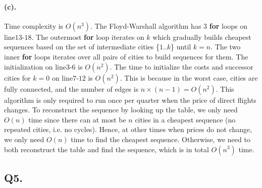 \documentclass[12pt]{article}
\begin{document}
\paragraph{(c).}
Time complexity is \(O(n^3)\). The Floyd-Warshall algorithm has 3 \textbf{for} loops on line\(13\)-\(18\). The outermost \textbf{for} loop iterates on \(k\) which gradually builds cheapest sequences based on the set of intermediate cities \{\(1..k\)\} until \(k = n\). The two inner \textbf{for} loops iterates over all pairs of cities to build sequences for them. The initialization on line\(3\)-\(6\) is \(O(n^2)\). The time to initialize the costs and successor cities for \(k=0\) on line\(7\)-\(12\) is \(O(n^2)\). This is because in the worst case, cities are fully connected, and the number of edges is \(n \times (n-1) = O(n^2)\). This algorithm is only required to run once per quarter when the price of direct flights changes. To reconstruct the sequence by looking up the table, we only need \(O(n)\) time since there can at most be \(n\) cities in a cheapest sequence (no repeated cities, i.e. no cycles). Hence, at other times when prices do not change, we only need \(O(n)\) time to find the cheapest sequence. Otherwise, we need to both reconstruct the table and find the sequence, which is in total \(O(n^3)\) time.

\subsection*{Q5.}
\end{document}
